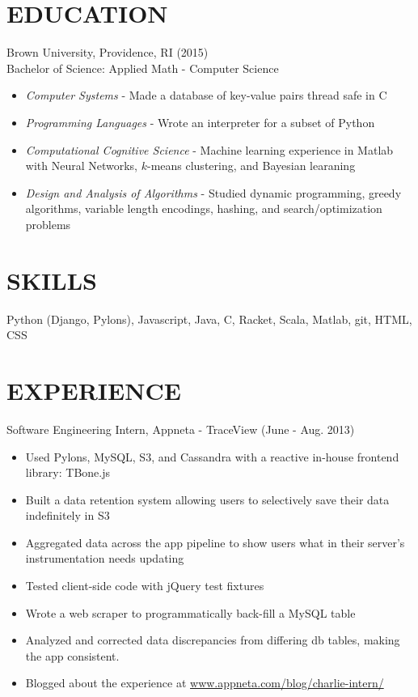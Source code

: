 \documentclass[11pt]{res} %
\begin{document}
\begin{resume}

\section{EDUCATION}
Brown University, Providence, RI (2015) \\
Bachelor of Science: Applied Math - Computer Science
\begin{itemize} \itemsep -2pt
  \item \emph{Computer Systems} - Made a database of key-value pairs thread safe in C
  \item \emph{Programming Languages} - Wrote an interpreter for a subset of Python
  \item \emph{Computational Cognitive Science} - Machine learning experience in Matlab with Neural Networks, $k$-means clustering, and Bayesian learaning
  \item \emph{Design and Analysis of Algorithms} - Studied dynamic programming, greedy algorithms, variable length encodings, hashing,  and search/optimization problems
\end{itemize}

 \section{SKILLS}
  Python (Django, Pylons), Javascript, Java, C, Racket, Scala, Matlab, git, HTML, CSS

\section{EXPERIENCE}
Software Engineering Intern, 
Appneta - TraceView 
(June - Aug. 2013)
\vspace{0.02in}
   \begin{itemize} \itemsep -2pt
   \item Used Pylons, MySQL, S3, and Cassandra with a reactive in-house frontend library: TBone.js
   \item Built a data retention system allowing users to selectively save their data indefinitely in S3
   \item Aggregated data across the app pipeline to show users what in their server's instrumentation needs updating 
   \item Tested client-side code with jQuery test fixtures
   \item Wrote a web scraper to programmatically back-fill a MySQL table
   \item Analyzed and corrected data discrepancies from differing db tables, making the app consistent.
   \item Blogged about the experience at \href{http://www.appneta.com/blog/charlie-intern/}{www.appneta.com/blog/charlie-intern/}
   \end{itemize}


\end{resume}
\end{document}
